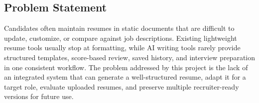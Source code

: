 \subsection{Problem Statement}
\noindent Candidates often maintain resumes in static documents that are difficult to update, customize, or compare against job descriptions. Existing lightweight resume tools usually stop at formatting, while AI writing tools rarely provide structured templates, score-based review, saved history, and interview preparation in one consistent workflow. The problem addressed by this project is the lack of an integrated system that can generate a well-structured resume, adapt it for a target role, evaluate uploaded resumes, and preserve multiple recruiter-ready versions for future use.
